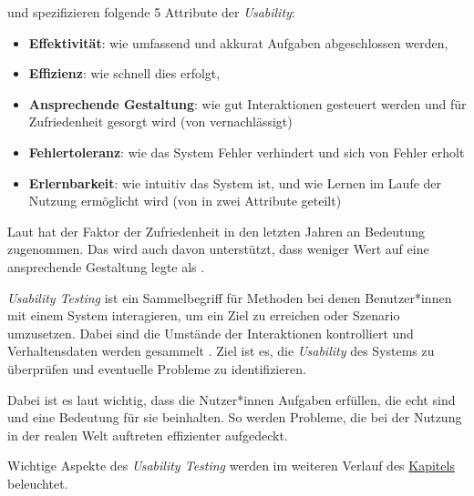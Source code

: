 \textcite{quesenberyDimensionsUsability2003} und \textcite{nielsenUsabilityEngineering1994} spezifizieren folgende 5 Attribute der \textit{Usability}:
\begin{itemize}
  \item \textbf{Effektivität}: wie umfassend und akkurat Aufgaben abgeschlossen werden,
  \item \textbf{Effizienz}: wie schnell dies erfolgt,
  \item \textbf{Ansprechende Gestaltung}: wie gut Interaktionen gesteuert werden und für Zufriedenheit gesorgt wird (von \textcite{nielsenUsabilityEngineering1994} vernachlässigt)
  \item \textbf{Fehlertoleranz}: wie das System Fehler verhindert und sich von Fehler erholt
  \item \textbf{Erlernbarkeit}: wie intuitiv das System ist, und wie Lernen im Laufe der Nutzung ermöglicht wird (von \textcite{nielsenUsabilityEngineering1994} in zwei Attribute geteilt)
\end{itemize}

Laut \textcite{barnumUsabilityTesting2021} hat der Faktor der Zufriedenheit in den letzten Jahren an Bedeutung zugenommen. Das wird auch davon unterstützt, dass \textcite{nielsenUsabilityEngineering1994} weniger Wert auf eine ansprechende Gestaltung legte als \textcite{quesenberyDimensionsUsability2003}.

\newpage

\textit{Usability Testing} ist ein Sammelbegriff für Methoden bei denen Benutzer*innen mit einem System interagieren, um ein Ziel zu erreichen oder Szenario umzusetzen. Dabei sind die Umstände der Interaktionen kontrolliert und Verhaltensdaten werden gesammelt \parencite{wichanskyUsabilityTesting2000}.
Ziel ist es, die \textit{Usability} des Systems zu überprüfen und eventuelle Probleme zu identifizieren.

Dabei ist es laut \textcite{barnumUsabilityTesting2021} wichtig, dass die Nutzer*innen Aufgaben erfüllen, die echt sind und eine Bedeutung für sie beinhalten. So werden Probleme, die bei der Nutzung in der realen Welt auftreten effizienter aufgedeckt.

Wichtige Aspekte des \textit{Usability Testing} werden im weiteren Verlauf des \hyperref[section:usability-testing]{Kapitels} beleuchtet.
